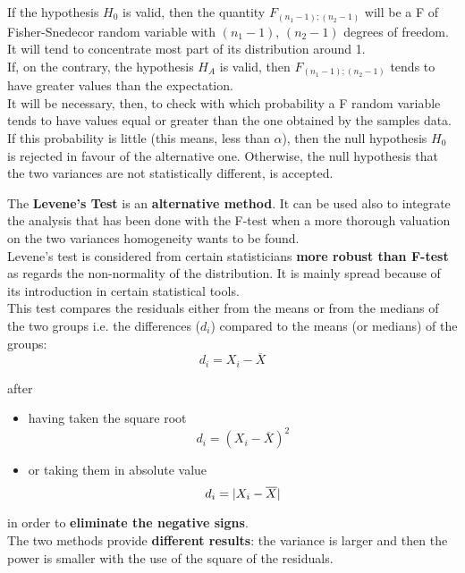 \begin{frame}
  \vspace*{.25cm}
  If the hypothesis $ H_0 $ is valid, then the quantity $ F_{(n_1-1);(n_2-1)} $ will be a F of Fisher-Snedecor random variable with $ (n_1-1),\,(n_2-1) $ degrees of freedom. It will tend to concentrate most part of its distribution around 1.\\
  \vspace*{.25cm}
  If, on the contrary, the hypothesis $ H_A $ is valid, then $ F_{(n_1-1);(n_2-1)} $ tends to have greater values than the expectation.\\
  \vspace*{.25cm}
  It will be necessary, then, to check with which probability a F random variable tends to have values equal or greater than the one obtained by the samples data. If this probability is little (this means, less than $ \alpha $), then the null hypothesis $ H_0 $ is rejected in favour of the alternative one. 
  Otherwise, the null hypothesis that the two variances are not statistically different, is accepted.
\end{frame}


\begin{frame}
  \vspace*{.25cm}
  The \textbf{Levene's Test} is an \textbf{alternative method}. It can be used also to integrate the analysis that has been done with the F-test when a more thorough valuation on the two variances homogeneity wants to be found.\\
  \vspace*{.25cm}
  Levene's test is considered from certain statisticians \textbf{more robust than F-test} as regards the non-normality of the distribution. It is mainly spread because of its introduction in certain statistical tools.\\
  \vspace*{.25cm}
  This test compares the residuals either from the means or from the medians of the two groups i.e. the differences ($ d_i $) compared to the means (or medians) of the groups:
  $$ d_i = X_i-\overline{X} $$
\end{frame}

\begin{frame}
  \vspace*{.25cm}
  after\\
  \begin{itemize}
    \item having taken the square root
    $$ d_i = (X_i - \overline{X})^2 $$
    \item or taking them in absolute value
    $$ d_i = \lvert X_i - \overline{X}\rvert $$
  \end{itemize}
  \vspace*{.25cm}
  in order to \textbf{eliminate the negative signs}.\\
  \vspace*{.25cm}
  The two methods provide \textbf{different results}: the variance is larger and then the power is smaller with the use of the square of the residuals.
\end{frame}

